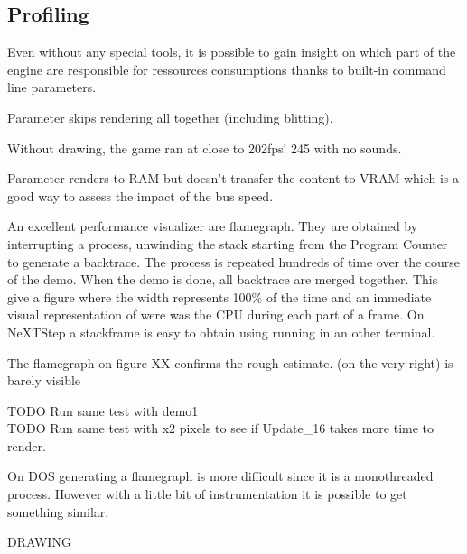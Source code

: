 \subsection{Profiling}
Even without any special tools, it is possible to gain insight on which part of the engine are responsible for ressources consumptions thanks to built-in command line parameters.\\
\par
Parameter  skips rendering all together (including blitting).\\
\par
\par
{}
\par
Without drawing, the game ran at close to 202fps! 245 with no sounds.\\
\par
Parameter  renders to RAM but doesn't transfer the content to VRAM which is a good way to assess the impact of the bus speed.\\
\par
{}
\par
An excellent performance visualizer are flamegraph. They are obtained by interrupting a process, unwinding the stack starting from the Program Counter to generate a backtrace. The process is repeated hundreds of time over the course of the demo. When the demo is done, all backtrace are merged together. This give a figure where the width represents 100\% of the time and an immediate visual representation of were was the CPU during each part of a frame. On NeXTStep a stackframe is easy to obtain using  running in an other terminal.\\
\par
The flamegraph on figure XX confirms the rough estimate.  (on the very right) is barely visible \\
\par
TODO Run same test with demo1\\
TODO Run same test with x2 pixels to see if Update\_16 takes more time to render.\\

\par
On DOS generating a flamegraph is more difficult since it is a monothreaded process. However with a little bit of instrumentation it is possible to get something similar.\\
\par
DRAWING

